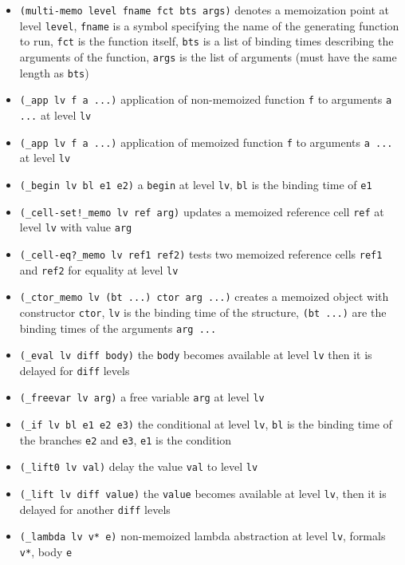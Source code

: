 \documentclass[11pt]{article}
\begin{document}
\begin{itemize}
\item \verb!(multi-memo level fname fct bts args)! denotes a
  memoization point at level \texttt{level}, \texttt{fname} is a
  symbol specifying the name of the generating function to run,
  \texttt{fct} is the function itself, \texttt{bts} is a list of
  binding times describing the arguments of the function,
  \texttt{args} is the list of arguments (must have the same length as
  \texttt{bts})
\item \verb!(_app lv f a ...)! application of non-memoized function
  \texttt{f} to arguments \texttt{a ...} at level \texttt{lv}
\item \verb!(_app lv f a ...)! application of memoized function
  \texttt{f} to arguments \texttt{a ...} at level \texttt{lv}
\item \verb!(_begin lv bl e1 e2)! a \texttt{begin} at level
  \texttt{lv}, \texttt{bl} is the binding time of \texttt{e1}
\item \verb+(_cell-set!_memo lv ref arg)+ updates a memoized reference
  cell \texttt{ref} at level \texttt{lv} with value \texttt{arg}
\item \verb!(_cell-eq?_memo lv ref1 ref2)! tests two memoized
  reference cells \texttt{ref1} and \texttt{ref2} for equality at
  level \texttt{lv}
\item \verb!(_ctor_memo lv (bt ...) ctor arg ...)! creates a memoized
  object with constructor \texttt{ctor}, \texttt{lv} is the binding
  time of the structure, \texttt{(bt ...)} are the binding times of
  the arguments \texttt{arg ...}
\item \verb!(_eval lv diff body)! the \texttt{body}  becomes available
  at level \texttt{lv} then it is delayed for \texttt{diff} levels
\item \verb!(_freevar lv arg)! a free variable \texttt{arg} at level
  \texttt{lv}
\item \verb!(_if lv bl e1 e2 e3)! the conditional at level
  \texttt{lv}, \texttt{bl} is the binding time of the branches
  \texttt{e2} and \texttt{e3}, \texttt{e1} is the condition
\item \verb!(_lift0 lv val)! delay the value \texttt{val} to level
  \texttt{lv}
\item \verb!(_lift lv diff value)! the \texttt{value} becomes
  available at level \texttt{lv}, then it is delayed for another
  \texttt{diff} levels
\item \verb!(_lambda lv v* e)! non-memoized lambda abstraction at
  level \texttt{lv}, formals \texttt{v*}, body \texttt{e}

\end{itemize}
\end{document}
